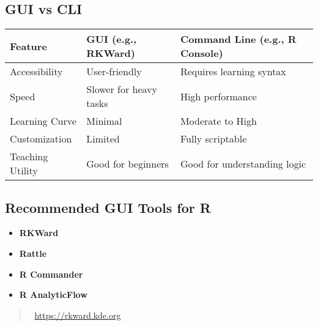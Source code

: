 \documentclass[
  letterpaper,
  DIV=11,
  numbers=noendperiod]{scrreprt}
\providecommand{\tightlist}{%
  \setlength{\itemsep}{0pt}\setlength{\parskip}{0pt}}
\begin{document}
\subsection{GUI vs CLI}\label{gui-vs-cli}

\begin{longtable}[]{@{}
  >{\raggedright\arraybackslash}p{}
  >{\raggedright\arraybackslash}p{}
  >{\raggedright\arraybackslash}p{}@{}}
\toprule\noalign{}
\begin{minipage}[b]{\linewidth}\raggedright
Feature
\end{minipage} & \begin{minipage}[b]{\linewidth}\raggedright
GUI (e.g., RKWard)
\end{minipage} & \begin{minipage}[b]{\linewidth}\raggedright
Command Line (e.g., R Console)
\end{minipage} \\
\midrule\noalign{}
\endhead
\bottomrule\noalign{}
\endlastfoot
Accessibility & User-friendly & Requires learning syntax \\
Speed & Slower for heavy tasks & High performance \\
Learning Curve & Minimal & Moderate to High \\
Customization & Limited & Fully scriptable \\
Teaching Utility & Good for beginners & Good for understanding logic \\
\end{longtable}

\subsection{Recommended GUI Tools for
R}\label{recommended-gui-tools-for-r}

\begin{itemize}
\tightlist
\item
  \textbf{RKWard}
\item
  \textbf{Rattle}
\item
  \textbf{R Commander}
\item
  \textbf{R AnalyticFlow}
\end{itemize}

\begin{quote}
🔗 \url{https://rkward.kde.org}
\end{quote}
\end{document}
